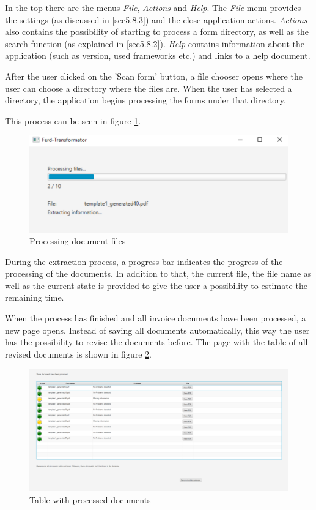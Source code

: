 In the top there are the menus \emph{File}, \emph{Actions} and \emph{Help}. The \emph{File} menu provides the settings (as discussed in \ref{sec5.8.3}) and the close application actions.
\emph{Actions} also contains the possibility of starting to process a form directory, as well as the search function (as explained in \ref{sec5.8.2}).
\emph{Help} contains information about the application (such as version, used frameworks etc.) and links to a help document.

After the user clicked on the 'Scan form' button, a file chooser opens where the user can choose a directory where the files are. When the user has selected a directory, the application begins processing the forms under that directory.

This process can be seen in figure \ref{processingFiles}.

\begin{figure}[ht!]
\centering
\includegraphics[scale=0.6,natwidth=211,natheight=79]{Images/GUI/processingFiles.pdf}
\caption{Processing document files \label{processingFiles}}
\end{figure}

During the extraction process, a progress bar indicates the progress of the processing of the documents. In addition to that, the current file, the file name as well as the current state is provided to give the user a possibility to estimate the remaining time.

When the process has finished and all invoice documents have been processed, a new page opens. Instead of saving all documents automatically, this way the user has the possibility to revise the documents before.
The page with the table of all revised documents is shown in figure \ref{reviseBeforeSafe}.

\begin{figure}[ht!]
\centering
\includegraphics[width=\textwidth,natwidth=613,natheight=289]{Images/GUI/reviseBeforeSafe.pdf}
\caption{Table with processed documents \label{reviseBeforeSafe}}
\end{figure}

